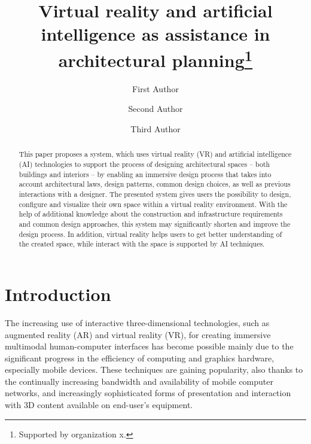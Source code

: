 \documentclass[runningheads]{llncs}
\begin{document}
%
\title{Virtual reality and artificial intelligence as assistance in architectural planning\thanks{Supported by organization x.}}
%
%
\author{First Author \and
Second Author \and
Third Author}
%
%
%
\maketitle              %
%
\begin{abstract}
This paper proposes a system, which uses virtual reality (VR) and artificial intelligence (AI) technologies to support the process of designing architectural spaces -- both buildings and interiors -- by enabling an immersive design process that takes into account architectural laws, design patterns, common design choices, as well as previous interactions with a designer. The presented system gives users the possibility to design, configure and visualize their own space within a virtual reality environment. With the help of additional knowledge about the construction and infrastructure requirements and common design approaches, this system may significantly shorten and improve the design process. In addition, virtual reality helps users to get better understanding of the created space, while interact with the space is supported by AI techniques.

\end{abstract}
%
%
%
\section{Introduction}
The increasing use of interactive three-dimensional technologies, such as augmented reality (AR) and virtual reality (VR), for creating immersive multimodal human-computer interfaces has become possible mainly due to the significant progress in the efficiency of computing and graphics hardware, especially mobile devices. These techniques are gaining popularity, also thanks to the continually increasing bandwidth and availability of mobile computer networks, and increasingly sophisticated forms of presentation and interaction with 3D content available on end-user's equipment.
\end{document}
